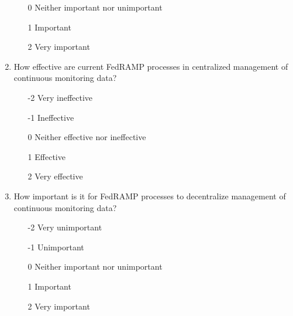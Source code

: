 \documentclass{jdf}
\begin{document}
\begin{enumerate}
\begin{enumerate}
        \item  [0] Neither important nor unimportant
        \item  [1] Important
        \item  [2] Very important
    \end{enumerate}
    \item How effective are current FedRAMP processes in centralized management of continuous monitoring data?
    \begin{enumerate}
        \item [-2] Very ineffective
        \item [-1] Ineffective
        \item  [0] Neither effective nor ineffective
        \item  [1] Effective 
        \item  [2] Very effective
    \end{enumerate}
    \item How important is it for FedRAMP processes to decentralize management of continuous monitoring data?
    \begin{enumerate}
        \item [-2] Very unimportant
        \item [-1] Unimportant
        \item  [0] Neither important nor unimportant
        \item  [1] Important
        \item  [2] Very important
    \end{enumerate}
\end{enumerate}
\end{document}
